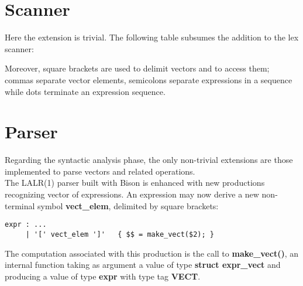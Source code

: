 \documentclass[11pt]{article}
\begin{document}
\section{Scanner}
Here the extension is trivial. The following table subsumes the addition to the lex scanner:
\begin{table}[H]
  \centering
  \label{tab:1}
\end{table}
Moreover, square brackets are used to delimit vectors and to access them; commas separate vector elements, semicolons separate expressions in a sequence while dots terminate an expression sequence.


\section{Parser}
Regarding the syntactic analysis phase, the only non-trivial extensions are those implemented to parse vectors and related operations.\\
The LALR(1) parser built with Bison is enhanced with new productions recognizing vector of expressions. An expression may now derive a new non-terminal symbol \textbf{vect_elem}, delimited by square brackets:
\begin{verbatim}
expr : ...
     | '[' vect_elem ']'   { $$ = make_vect($2); }
\end{verbatim}{}

The computation associated with this production is the call to
\textbf{make\_vect()}, an internal function taking as argument a value of type \textbf{struct expr\_vect} and producing a value of type \textbf{expr} with type tag \textbf{VECT}.\\
\end{document}
